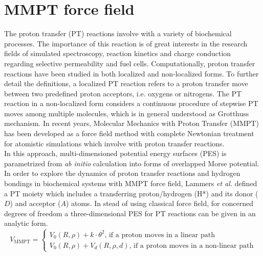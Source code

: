 \documentclass[journal=jacsat,manuscript=article]{achemso}
\author{Zhen-Hao Xu, Krystel El Hage and Markus Meuwly}
\affiliation{Department of Chemistry, University of Basel, Klingelbergstrasse 80, CH-4056 Basel, Switzerland.}
\date{\today}
\title{}
\begin{document}
\begin{abstract}

\end{abstract}

\clearpage

\section{MMPT force field}
The proton transfer (PT) reactions involve with a variety of biochemical processes.
The importance of this reaction is of great interests in the research fields of simulated spectroscopy\cite{wolke.sci.2016.watercluster,fournier.pnas.2014.watercluster,mackeprangmeuwly.pccp.2016.mmpt,wolkejohnson.jpca.2015.oxalate,howardmeuwly.jpca.2015.mmpt}, reaction kinetics\cite{huangmeuwly.pccp.2014.kie} and charge conduction regarding selective permeability and fuel cells\cite{luduenasebastiani.cm.2011.conduct}.
Computationally, proton transfer reactions have been studied in both localized and non-localized forms.
To further detail the definitions, a localized PT reaction refers to a proton transfer move between two predefined proton acceptors, i.e. oxygens or nitrogens\cite{lammersmeuwly.jcc.2008.mmpt}.
The PT reaction in a non-localized form considers a continuous procedure of stepwise PT moves among multiple molecules, which is in general understood as Grotthuss mechanism. In recent years, Molecular Mechanics with Proton Transfer (MMPT) has been developed as a force field method with complete Newtonian treatment for atomistic simulations which involve with proton transfer reactions\cite{lammersmeuwly.jcc.2008.mmpt,yangmeuwly.jcp.2010.mmpt}.
\\
\noindent
In this approach, multi-dimensioned potential energy surfaces (PES) is parametrized from \emph{ab initio} calculation into forms of overlapped Morse potential. In order to explore the dynamics of proton transfer reactions and hydrogen bondings in biochemical systems with MMPT force field, Lammers \emph{et al.}\cite{lammersmeuwly.jcc.2008.mmpt} defined a PT moiety which includes a transferring proton/hydrogen (H*) and its donor ($ D $) and acceptor ($ A $) atoms. In stead of using classical force field, for concerned degrees of freedom a three-dimensional PES for PT reactions can be given in an analytic form.
\begin{equation}
V_{\textrm{MMPT}}=\left\{
\begin{array}{ll}
V_{0}(R,\rho)+k\cdot\theta^2\textrm{, if a proton moves in a linear path}\\
V_{0}(R,\rho)+V_{d}(R,\rho,d)\textrm{, if a proton moves in a non-linear path}
\end{array}
\right.
\label{eq:vmmpt}
\end{equation}
\end{document}
